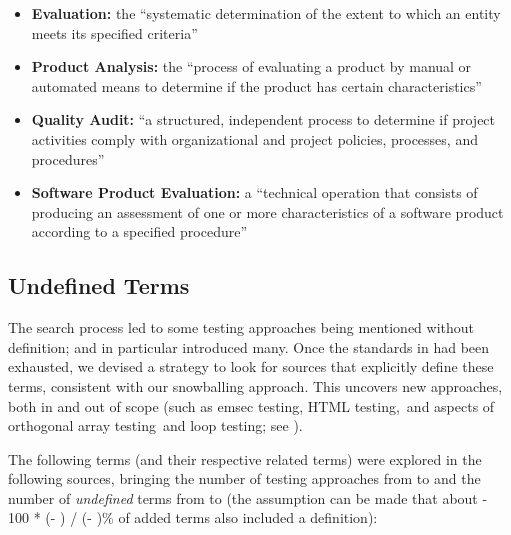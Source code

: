     \begin{itemize}
        \item \textbf{Evaluation:} the ``systematic determination of the extent
              to which an entity meets its specified criteria''
              \citep[p.~167]{IEEE2017}
        \item \textbf{Product Analysis:} the ``process of evaluating a product by
              manual or automated means to determine if the product has certain
              characteristics'' \citep[p.~343]{IEEE2017}
        \item \textbf{Quality Audit:} ``a structured, independent process to
              determine if project activities comply with organizational and
              project policies, processes, and procedures'' \citep[p.~361]{IEEE2017}
        \item \textbf{Software Product Evaluation:} a ``technical operation that
              consists of producing an assessment of one or more characteristics
              of a software product according to a specified procedure''
              \citep[p.~424]{IEEE2017}
    \end{itemize}
\fi
\subsection{Undefined Terms}
\label{undef-terms}

The search process led to some testing approaches being
mentioned without definition;
\citep{IEEE2022} and \citep{Firesmith2015} in particular introduced many.
Once the standards in  had been exhausted, we devised a strategy to
look for sources that explicitly define these terms, consistent with
our snowballing approach. This uncovers new approaches, both in and out of
scope (such as \acf{emsec} testing\ifnotpaper, HTML testing,\fi\ and aspects
of orthogonal array testing\ifnotpaper\ and loop testing\fi; see ).

The following terms (and their respective related terms) were explored
in the following sources, bringing the number of testing
approaches from \the\TotalBefore{} to \the\TotalAfter{} and the number of
\emph{undefined} terms from \the\UndefBefore{} to \the\UndefAfter{} (the
assumption can be made that about \the{} - 100 * (\UndefAfter -
\UndefBefore) / (\TotalAfter - \TotalBefore)\relax\% of added terms also
included a definition):


